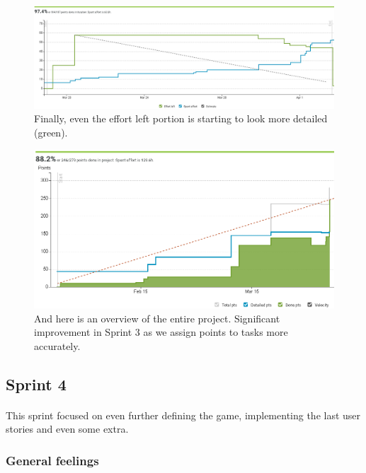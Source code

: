 \begin{figure}[H]
\centering
\caption{Finally, even the effort left portion is starting to look more detailed (green).}
\includegraphics[width=\textwidth]{sprint3} %
\end{figure}

\begin{figure}[H]
\centering
\caption{And here is an overview of the entire project. Significant improvement in Sprint 3 as we assign points to tasks more accurately.}
\includegraphics[width=\textwidth]{overview}
\end{figure}

\subsection{Sprint 4}

\paragraph{} This sprint focused on even further defining the game, implementing the last user stories and even some extra.

\subsubsection{General feelings}


